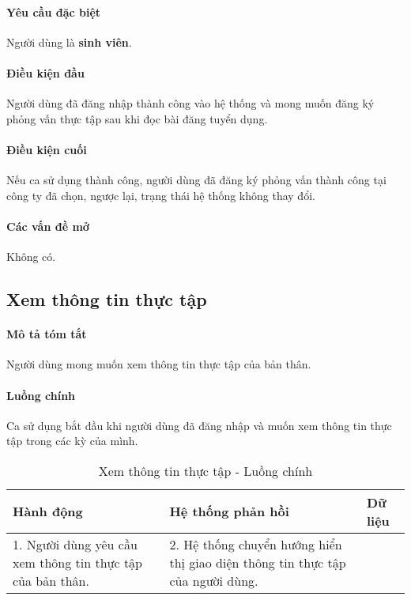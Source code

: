 \documentclass[./../main.tex]{subfiles}
\begin{document}
\paragraph*{Yêu cầu đặc biệt}

Người dùng là \textbf{sinh viên}.

\paragraph*{Điều kiện đầu}

Người dùng đã đăng nhập thành công vào hệ thống và mong muốn đăng ký
phỏng vấn thực tập sau khi đọc bài đăng tuyển dụng.

\paragraph*{Điều kiện cuối}

Nếu ca sử dụng thành công, người dùng đã đăng ký phỏng vấn thành công
tại công ty đã chọn, ngược lại, trạng thái hệ thống không thay đổi.

\paragraph*{Các vấn đề mở}

Không có.

\subsection{Xem thông tin thực tập}

\paragraph*{Mô tả tóm tắt}

Người dùng mong muốn xem thông tin thực tập của bản thân.

\paragraph*{Luồng chính} Ca sử dụng bắt đầu khi người dùng đã đăng nhập và muốn xem thông tin thực tập trong các kỳ của mình.

\begin{table}[H]
	\caption{Xem thông tin thực tập - Luồng chính}
	\label{tab:read_internship_info}
	\begin{tabularx}{\textwidth}{|X|X|X|}
		\hline
		\textbf{Hành động}                                         & \textbf{Hệ thống phản hồi}                                                     & \textbf{Dữ liệu} \\ \hline
		1. Người dùng yêu cầu xem thông tin thực tập của bản thân. & 2. Hệ thống chuyển hướng hiển thị giao diện thông tin thực tập của người dùng. &                  \\ \hline
	\end{tabularx}
\end{table}
\end{document}
